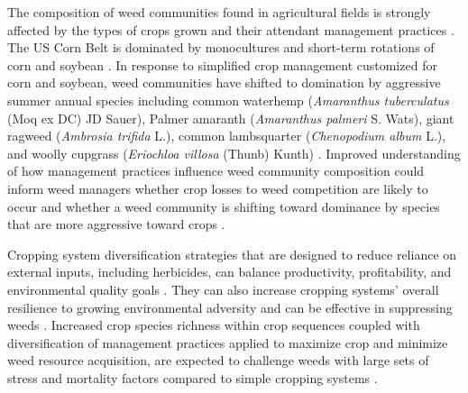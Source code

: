 \documentclass[
]{article}
\begin{document}
The composition of weed communities found in agricultural fields is strongly affected by the types of crops grown and their attendant management practices \citep{mohlerWeedEvolutionCommunity2001, legereDiversityAssemblyWeed2005, culpepperGlyphosateinducedWeedShifts2006, smithAssemblyWeedCommunities2007}. The US Corn Belt is dominated by monocultures and short-term rotations of corn and soybean \citep{centerforspatialinformationscienceandsystemsCropScapeCroplandData2021}. In response to simplified crop management customized for corn and soybean, weed communities have shifted to domination by aggressive summer annual species including common waterhemp (\emph{Amaranthus tuberculatus} (Moq ex DC) JD Sauer), Palmer amaranth (\emph{Amaranthus palmeri} S. Wats), giant ragweed (\emph{Ambrosia triﬁda} L.), common lambsquarter (\emph{Chenopodium album} L.), and woolly cupgrass (\emph{Eriochloa villosa} (Thunb) Kunth) \citep{owenWeedSpeciesShifts2008, krugerGrowerViewsProblematic2009, reddyGlyphosateresistantCropProduction2010}. Improved understanding of how management practices influence weed community composition could inform weed managers whether crop losses to weed competition are likely to occur and whether a weed community is shifting toward dominance by species that are more aggressive toward crops \citep{liebmanWeedManagementNeed2001}.

Cropping system diversification strategies that are designed to reduce reliance on external inputs, including herbicides, can balance productivity, profitability, and environmental quality goals \citep{davisIncreasingCroppingSystem2012, huntReducingFreshwaterToxicity2017, huntCroppingSystemDiversity2019, huntFossilEnergyUse2020, tamburiniAgriculturalDiversificationPromotes2020, bowlesLongtermEvidenceShows2020, beillouinPositiveVariableEffects2021}. They can also increase cropping systems' overall resilience to growing environmental adversity \citep{bowlesLongtermEvidenceShows2020} and can be effective in suppressing weeds \citep{weisbergerDoesDiversifyingCrop2019}. Increased crop species richness within crop sequences coupled with diversification of management practices applied to maximize crop and minimize weed resource acquisition, are expected to challenge weeds with large sets of stress and mortality factors compared to simple cropping systems \citep{liebmanManyLittleHammers1997, liebmanCropDiversificationWeed2001, westermanAreManyLittle2005}.
\end{document}
